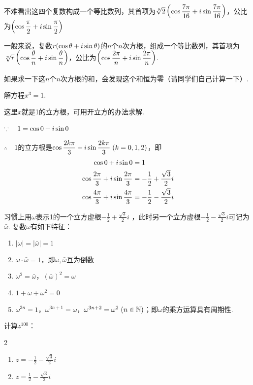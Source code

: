 不难看出这四个复数构成一个等比数列，其首项为$\sqrt[8]{2}\left(\cos\dfrac{7\pi}{16}+i\sin\dfrac{7\pi}{16}\right)$，公比为$\left(\cos\dfrac{\pi}{2}+i\sin\dfrac{\pi}{2}\right)$

一般来说，复数$r(\cos\theta+i\sin\theta)$的$n$个$n$次方根，组成一个等比数列，其首项为$\sqrt[n]{r}\left(\cos\dfrac{\theta}{n}+i\sin\dfrac{\theta}{n}\right)$，公比为$\left(\cos\dfrac{2\pi}{n}+i\sin\dfrac{2\pi}{n}\right)$.

如果求一下这$n$个$n$次方根的和，会发现这个和恒为零（请同学们自己计算一下）.

\begin{example}
    解方程$x^3=1$.
\end{example}

\begin{analyze}
这里$x$就是1的立方根，可用开立方的办法求解.
\end{analyze}

\begin{solution}
$\because\quad 1=\cos0+i\sin0$

$\therefore\quad$1的立方根是$\cos\dfrac{2k\pi}{3}+i\sin\dfrac{2k\pi}{3}\; (k=0,1,2)$，即
\[\begin{split}
    \cos0+i\sin0&=1\\
    \cos\dfrac{2\pi}{3}+i\sin\dfrac{2\pi}{3}&=-\dfrac{1}{2}+\dfrac{\sqrt{3}}{2}i\\
    \cos\dfrac{4\pi}{3}+i\sin\dfrac{4\pi}{3}&=-\dfrac{1}{2}-\dfrac{\sqrt{3}}{2}i\\
\end{split}\]
\end{solution}

\begin{note}
习惯上用$\omega$表示1的一个立方虚根$-\frac{1}{2}+\frac{\sqrt{3}}{2}i$
    ，此时另一个立方虚根$-\frac{1}{2}-\frac{\sqrt{3}}{2}i$可记为$\bar\omega$. 复数$\omega$有如下特征：
\begin{enumerate}[(1)]
    \item   $|\omega|=|\bar\omega|=1$
    \item $\omega\cdot \bar\omega=1$，即$\omega,\bar\omega$互为倒数
    \item $\omega^2=\bar\omega$，$(\bar\omega)^2=\omega$
    \item $1+\omega+\omega^2=0$
    \item $\omega^{3n}=1$，$\omega^{3n+1}=\omega$，$\omega^{3n+2}=\omega^2\; (n\in\mathbb{N})$；即$\omega$的乘方运算具有周期性. 
\end{enumerate}
\end{note}

\begin{example}
计算$z^{100}$：
\begin{multicols}{2}
\begin{enumerate}[(1)]
    \item $z=-\frac{1}{2}-\frac{\sqrt{3}}{2}i$
    \item $z=\frac{1}{2}-\frac{\sqrt{3}}{2}i$
\end{enumerate}
\end{multicols}
\end{example}

